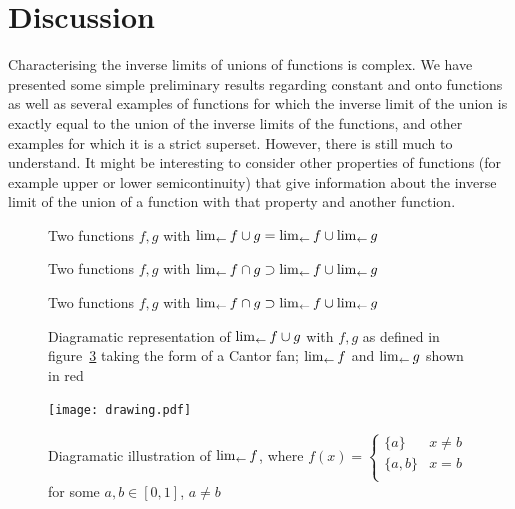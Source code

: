 \documentclass{article}
\theoremstyle{definition}
\begin{document}
\section{Discussion}

Characterising the inverse limits of unions of functions is complex.
We have presented some simple preliminary results regarding constant
and onto functions as well as several examples of functions for which
the inverse limit of the union is exactly equal to the union of the
inverse limits of the functions, and other examples for which it is a
strict superset.  However, there is still much to understand.  It
might be interesting to consider other properties of functions (for
example upper or lower semicontinuity) that give information about the
inverse limit of the union of a function with that property and
another function.




\begin{figure}[h]
\caption{Two \label{abuse} functions $f,g$ with $\lim_{\leftarrow} f\cup g=\lim_{\leftarrow} f\cup\lim_{\leftarrow} g$}
\end{figure}

\begin{figure}[h]
\caption{Two \label{strictly} functions $f,g$ with $\lim_{\leftarrow} f\cap g\supset\lim_{\leftarrow} f\cup\lim_{\leftarrow} g$}
\end{figure}

\begin{figure}[h]
\caption{Two \label{strictsuperset} functions $f,g$ with $\lim_{\leftarrow} f\cap g\supset\lim_{\leftarrow} f\cup\lim_{\leftarrow} g$}
\end{figure}

\begin{figure}[h]
\caption{Diagramatic representation of\label{cantorfan} $\lim_{\leftarrow} f\cup
    g$ with $f,g$ as defined in figure~\ref{strictsuperset} taking the
  form of a Cantor fan; $\lim_{\leftarrow} f$ and $\lim_{\leftarrow} g$ shown in red}
\end{figure}

\begin{figure}[h]
\centering
\texttt{[image: drawing.pdf]}
\caption[width=\textwidth]{Diagramatic illustration of 
  \label{drawing} $\lim_{\leftarrow} f$, where $f(x) = \begin{cases}
    \lbrace a\rbrace & x\neq b\\
    \lbrace a,b\rbrace & x=b\\
    \end{cases}$ for some $a,b\in[0,1]$, $a\neq b$}
\end{figure}



\end{document}
